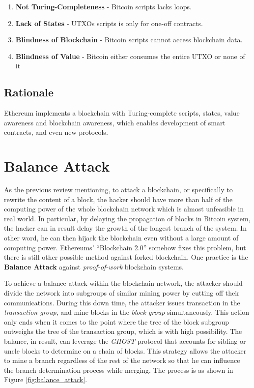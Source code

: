\documentclass[12pt]{article}
\begin{document}
\begin{enumerate}
    \item \textbf{Not Turing-Completeness} - Bitcoin scripts lacks loops.
    \item \textbf{Lack of States} - UTXOs scripts is only for one-off contracts.
    \item \textbf{Blindness of Blockchain} - Bitcoin scripts cannot access blockchain data.
    \item \textbf{Blindness of Value} - Bitcoin either consumes the entire UTXO or none of it
\end{enumerate}

\subsection{Rationale}

Ethereum implements a blockchain with Turing-complete scripts, states, value awareness and blockchain awareness, which enables development of smart contracts, and even new protocols.

\section{Balance Attack}
\label{sec:Balance Attack}

As the previous review mentioning, to attack a blockchain, or specifically to rewrite the content of a block, the hacker should have more than half of the computing power of the whole blockchain network which is almost unfeasible in real world. In particular, by delaying the propagation of blocks in Bitcoin system, the hacker can in result delay the growth of the longest branch of the system. In other word, he can then hijack the blockchain even without a large amount of computing power. Ethereums' ``Blockchain 2.0'' somehow fixes this problem, but there is still other possible method against forked blockchain. One practice is the \textbf{Balance Attack} against \textit{proof-of-work} blockchain systems.

To achieve a balance attack within the blockchain network, the attacker should divide the network into subgroups of similar mining power by cutting off their communications. During this down time, the attacker issues transaction in the \textit{transaction group}, and mine blocks in the \textit{block group} simultaneously. This action only ends when it comes to the point where the tree of the block subgroup outweighs the tree of the transaction group, which is with high possibility. The balance, in result, can leverage the \textit{GHOST} protocol that accounts for sibling or uncle blocks to determine on a chain of blocks. This strategy allows the attacker to mine a branch regardless of the rest of the network so that he can influence the branch determination process while merging. The process is as shown in Figure \ref{fig:balance_attack}.
\end{document}
